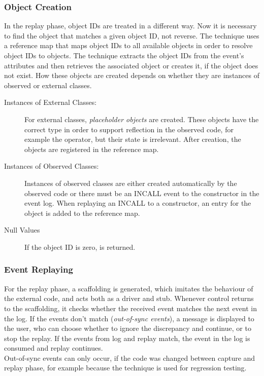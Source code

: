 \subsubsection{Object Creation}
In the replay phase, object IDs are treated in a different way. Now it is necessary to find the object that matches a given object ID, not reverse. The technique uses a reference map that maps object IDs to all available objects in order to resolve object IDs to objects. The technique extracts the object IDs from the event's attributes and then retrieves the associated object or creates it, if the object does not exist. How these objects are created depends on whether they are instances of observed or external classes.
\begin{description}
 \item [Instances of External Classes:] For external classes, \emph{placeholder objects} are created. These objects have the correct type in order to support reflection in the observed code, for example the  operator, but their state is irrelevant. After creation, the objects are registered in the reference map.
 \item [Instances of Observed Classes:] Instances of observed classes are either created automatically by the observed code or there must be an INCALL event to the constructor in the event log. When replaying an INCALL to a constructor, an entry for the object is added to the reference map.
 \item [Null Values] If the object ID is zero,  is returned.
\end{description}

\subsubsection{Event Replaying}
For the replay phase, a scaffolding is generated, which imitates the behaviour of the external code, and acts both as a driver and stub. Whenever control returns to the scaffolding, it checks whether the received event matches the next event in the log. If the events don't match (\emph{out-of-sync events}), a message is displayed to the user, who can choose whether to ignore the discrepancy and continue, or to stop the replay. If the events from log and replay match, the event in the log is  consumed and replay continues. \\
Out-of-sync events can only occur, if the code was changed between capture and replay phase, for example because the technique is used for regression testing. 

